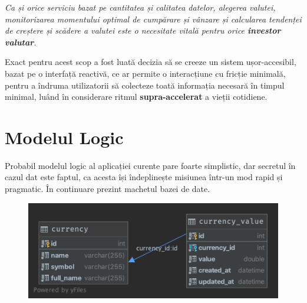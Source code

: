 \documentclass[12pt. a4paper]{report}
\begin{document}
\emph{Ca și orice serviciu bazat pe cantitatea și calitatea datelor, alegerea valutei, monitorizarea momentului optimal de cumpărare și vânzare și calcularea tendenței de creștere și scădere a valutei este o necesitate vitală pentru orice \textbf{investor valutar}.}

Exact pentru acest scop a fost luată decizia să se creeze un sistem ușor-accesibil, bazat pe o interfață reactivă, ce ar permite o interacțiune cu fricție minimală, pentru a îndruma utilizatorii să colecteze toată informația necesară în timpul minimal, luând în considerare ritmul \textbf{supra-accelerat} a vieții cotidiene.

\section{Modelul Logic}

\begin{center}
\end{center}


Probabil modelul logic al aplicației curente pare foarte simplistic, dar secretul în cazul dat este faptul, ca acesta își îndeplinește misiunea într-un mod rapid și pragmatic. În continuare prezint machetul bazei de date.

\begin{figure}[H]
\center
\includegraphics[width=\textwidth]{currency_tracker}
\end{figure}
\end{document}
